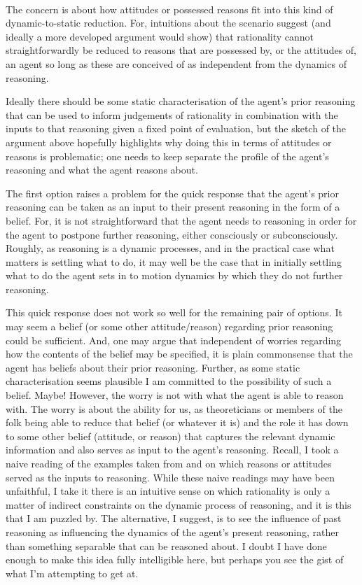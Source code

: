 \documentclass[10pt]{article}
\begin{document}
\paragraph*{}

The concern is about how attitudes or possessed reasons fit into this kind of dynamic-to-static reduction.
For, intuitions about the scenario suggest (and ideally a more developed argument would show) that rationality cannot straightforwardly be reduced to reasons that are possessed by, or the attitudes of, an agent so long as these are conceived of as independent from the dynamics of reasoning.

Ideally there should be some static characterisation of the agent's prior reasoning that can be used to inform judgements of rationality in combination with the inputs to that reasoning given a fixed point of evaluation, but the sketch of the argument above hopefully highlights why doing this in terms of attitudes or reasons is problematic; one needs to keep separate the profile of the agent's reasoning and what the agent reasons about.

The first option raises a problem for the quick response that the agent's prior reasoning can be taken as an input to their present reasoning in the form of a belief.
For, it is not straightforward that the agent needs to reasoning in order for the agent to postpone further reasoning, either consciously or subconsciously.
Roughly, as reasoning is a dynamic processes, and in the practical case what matters is settling what to do, it may well be the case that in initially settling what to do the agent sets in to motion dynamics by which they do not further reasoning.

This quick response does not work so well for the remaining pair of options.
It may seem a belief (or some other attitude/reason) regarding prior reasoning could be sufficient.
And, one may argue that independent of worries regarding how the contents of the belief may be specified, it is plain commonsense that the agent has beliefs about their prior reasoning.
Further, as some static characterisation seems plausible I am committed to the possibility of such a belief.
Maybe!
However, the worry is not with what the agent is able to reason with.
The worry is about the ability for us, as theoreticians or members of the folk being able to reduce that belief (or whatever it is) and the role it has down to some other belief (attitude, or reason) that captures the relevant dynamic information and also serves as input to the agent's reasoning.
Recall, I took a naive reading of the examples taken from \citeauthor{Lord:2017aa} and \citeauthor{Broome:2013aa} on which reasons or attitudes served as the inputs to reasoning.
While these naive readings may have been unfaithful, I take it there is an intuitive sense on which rationality is only a matter of indirect constraints on the dynamic process of reasoning, and it is this that I am puzzled by.
The alternative, I suggest, is to see the influence of past reasoning as influencing the dynamics of the agent's present reasoning, rather than something separable that can be reasoned about.
I doubt I have done enough to make this idea fully intelligible here, but perhaps you see the gist of what I'm attempting to get at.
\end{document}
